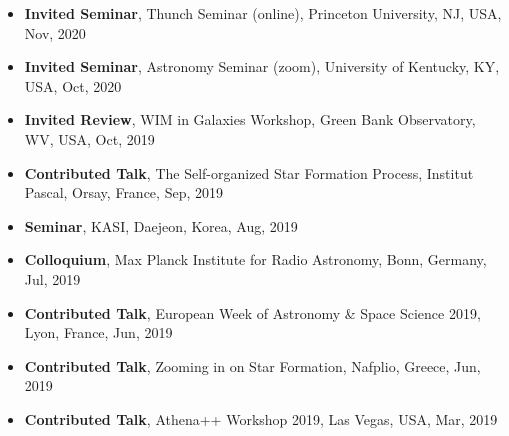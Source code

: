 \documentclass[11pt,letterpaper,roman]{moderncv}        %
\begin{document}
\begin{itemize}
\item \textbf{Invited Seminar},
  Thunch Seminar (online), Princeton University, NJ, USA, Nov, 2020 %
\item \textbf{Invited Seminar},
  Astronomy Seminar (zoom), University of Kentucky, KY, USA, Oct, 2020 %
\item \textbf{Invited Review},
  WIM in Galaxies Workshop, Green Bank Observatory, WV, USA, Oct, 2019 %
\item \textbf{Contributed Talk},
  The Self-organized Star Formation Process, Institut Pascal, Orsay, France, Sep, 2019 %
\item \textbf{Seminar},
  KASI, Daejeon, Korea, Aug, 2019 %
\item \textbf{Colloquium},
  Max Planck Institute for Radio Astronomy, Bonn, Germany, Jul, 2019 %
\item \textbf{Contributed Talk},
  European Week of Astronomy \& Space Science 2019, Lyon, France, Jun, 2019 %
\item \textbf{Contributed Talk},
  Zooming in on Star Formation, Nafplio, Greece, Jun, 2019 %
\item \textbf{Contributed Talk},
  Athena++ Workshop 2019, Las Vegas, USA, Mar, 2019 %

\end{itemize}
\end{document}
